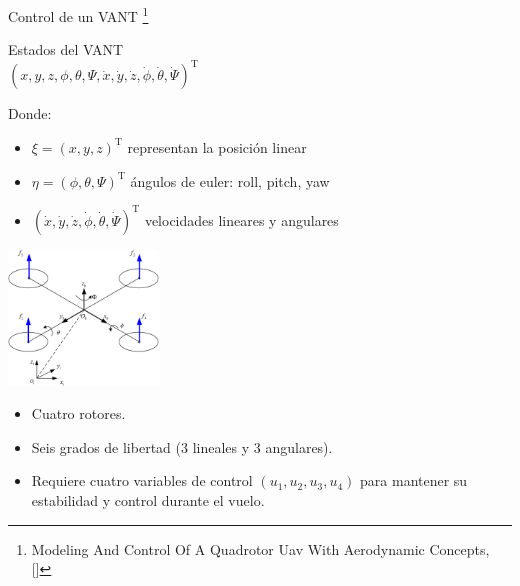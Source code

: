 \documentclass[24pt,aspectratio=169]{beamer}
\begin{document}
\begin{frame}{Control de un VANT \footnote{Modeling And Control Of A Quadrotor Uav With Aerodynamic Concepts, [\cite{1334249}]}}
  
  \begin{minipage}{0.47\textwidth}
     
    Estados del VANT \\
    $(x,y,z,\phi,\theta,\Psi,\dot{x},\dot{y},\dot{z},\dot{\phi},\dot{\theta},\dot{\Psi})^\mathrm{T}$

    \bigskip %
    
    Donde:
    \begin{itemize}
    \item $\xi = (x,y,z)^\mathrm{T}$ representan la posición linear
    \item $\eta = (\phi,\theta,\Psi)^\mathrm{T}$ ángulos de euler: roll, pitch, yaw
    \item $(\dot{x},\dot{y},\dot{z},\dot{\phi},\dot{\theta},\dot{\Psi})^\mathrm{T}$ velocidades lineares y angulares
    \end{itemize}
  \end{minipage}
  \hspace{0.2cm}
  \begin{minipage}{0.5\textwidth}
    \centering
    \includegraphics[width=4cm]{uav_model.jpeg}
    \bigskip %
    {\scriptsize
      \begin{itemize}
      \item Cuatro rotores.
      \item Seis grados de libertad (3 lineales y 3 angulares).
      \item Requiere cuatro variables de control $(u_1, u_2, u_3, u_4)$ para mantener su estabilidad y control durante el vuelo.
      \end{itemize}
    }
  \end{minipage}
  \bigskip %
\end{frame}
\end{document}
